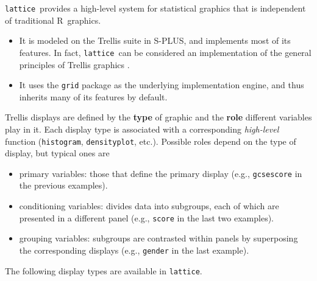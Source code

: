 \documentclass[10pt]{article}
\newcommand{\R}{\textsf{R}}
\newcommand{\code}[1]{\texttt{#1}}
\newcommand{\lattice}{\code{lattice}}
\newcommand{\Rpackage}[1]{\code{#1}}
\begin{document}
\lattice\ provides a high-level system for statistical graphics that
is independent of traditional \R\ graphics.
\begin{itemize}
\item It is modeled on the Trellis suite in \textsf{S-PLUS}, and
  implements most of its features.  In fact, \lattice\ can be
  considered an implementation of the general principles of Trellis
  graphics \citep{becker1996vda}.
\item It uses the \Rpackage{grid} package \citep{murrell2005} as the
  underlying implementation engine, and thus inherits many of its
  features by default.
\end{itemize}
Trellis displays are defined by the \textbf{type} of graphic and the
\textbf{role} different variables play in it.  Each display type is
associated with a corresponding \emph{high-level} function
(\code{histogram}, \code{densityplot}, etc.).  Possible roles depend
on the type of display, but typical ones are
\begin{itemize}
\item primary variables: those that define the primary display (e.g.,
  \code{gcsescore} in the previous examples).
\item conditioning variables: divides data into subgroups, each of
  which are presented in a different panel (e.g., \code{score} in the
  last two examples).
\item grouping variables: subgroups are contrasted within panels by
  superposing the corresponding displays (e.g., \code{gender} in the
  last example).
\end{itemize}
The following display types are available in \lattice.
\end{document}
